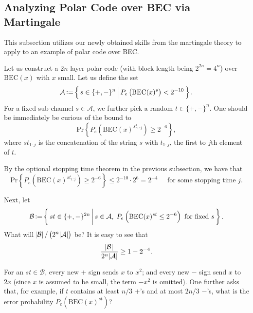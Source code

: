 \subsection{Analyzing Polar Code over BEC via Martingale}
This subsection utilizes our newly obtained skills from the martingale theory to apply to an example of polar code over BEC.

\begin{example}
    Let us construct a $2n$-layer polar code (with block length being $2^{2n}=4^n$) over $\mathrm{BEC}(x)$ with $x$ small. Let us define the set
    \begin{equation*}
        \mathcal{A} \operatorname{\vcentcolon=} \left\{\,{s\in\{+,-\}^n}\,\middle\vert\,{P_e\left(\mathrm{BEC}(x)^s\right) < 2^{-10}}\,\right\}.
    \end{equation*}
    For a fixed sub-channel $s\in\mathcal{A}$, we further pick a random $t\in\{+,-\}^n$. One should be immediately be curious of the bound to
    \begin{equation*}
        \mathrm{Pr}\left\{P_e\left(\mathrm{BEC}(x)^{st_{1:j}}\right) \ge 2^{-6}\right\},
    \end{equation*}
    where $st_{1:j}$ is the concatenation of the string $s$ with $t_{1:j}$, the first to $j$th element of $t$.
    
    By the optional stopping time theorem in the previous subsection, we have that
    \begin{equation*}
        \mathrm{Pr}\left\{P_e\left(\mathrm{BEC}(x)^{st_{1:j}}\right) \ge 2^{-6}\right\} \le 2^{-10}\cdot 2^{6} = 2^{-4} \;\;\;\;\;\text{for some stopping time $j$.}
    \end{equation*}
    
    Next, let
    \begin{equation*}
        \mathcal{B} \operatorname{\vcentcolon=} \left\{\,{st\in\{+,-\}^{2n}}\,\middle\vert\,{s\in\mathcal{A},\; P_e\left(\mathrm{BEC}(x)^{st} \le 2^{-6}\right) \text{ for fixed }s}\,\right\}.
    \end{equation*}
    What will $\abs{\mathcal{B}} / \left(2^n\abs{\mathcal{A}}\right)$ be? It is easy to see that
    \begin{equation*}
        \frac{\abs{\mathcal{B}}}{2^n\abs{\mathcal{A}}} \ge 1-2^{-4}.
    \end{equation*}
    
    For an $st\in\mathcal{B}$, every new $+$ sign sends $x$ to $x^2$; and every new $-$ sign send $x$ to $2x$ (since $x$ is assumed to be small, the term $-x^2$ is omitted). One further asks that, for example, if $t$ contains at least $n/3$ $+$'s and at most $2n/3$ $-$'s, what is the error probability $P_e\left(\mathrm{BEC}(x)^{st}\right)$?
    

\end{example}
